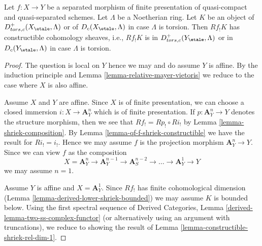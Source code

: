 \begin{theorem}
\label{theorem-constructible-shriek}
Let $f : X \to Y$ be a separated morphism of finite presentation
of quasi-compact and quasi-separated schemes. Let $\Lambda$ be a
Noetherian ring. Let $K$ be an object of $D^+_{tors, c}(X_\etale, \Lambda)$
or of $D_c(X_\etale, \Lambda)$ in case $\Lambda$ is torsion.
Then $Rf_!K$ has constructible cohomology sheaves, i.e.,
$Rf_!K$ is in $D^+_{tors, c}(Y_\etale, \Lambda)$
or in $D_c(Y_\etale, \Lambda)$ in case $\Lambda$ is torsion.
\end{theorem}

\begin{proof}
The question is local on $Y$ hence we may and do assume $Y$ is affine.
By the induction principle and Lemma \ref{lemma-relative-mayer-vietoris}
we reduce to the case where $X$ is also affine.

\medskip\noindent
Assume $X$ and $Y$ are affine. Since $X$ is of finite presentation,
we can choose a closed immersion $i : X \to \mathbf{A}^n_Y$ which is
of finite presentation. If $p : \mathbf{A}^n_Y \to Y$ denotes
the structure morphism, then we see that $Rf_! = Rp_! \circ Ri_!$
by Lemma \ref{lemma-shriek-composition}. By
Lemma \ref{lemma-qf-f-shriek-constructible}
we have the result for $Ri_! = i_!$. Hence we may assume $f$
is the projection morphism $\mathbf{A}^n_Y \to Y$.
Since we can view $f$ as the composition
$$
X = \mathbf{A}^n_Y \to \mathbf{A}^{n - 1}_Y \to
\mathbf{A}^{n - 2}_S \to \ldots \to
\mathbf{A}^1_Y \to Y
$$
we may assume $n = 1$.

\medskip\noindent
Assume $Y$ is affine and $X = \mathbf{A}^1_Y$. Since $Rf_!$ has
finite cohomological dimension
(Lemma \ref{lemma-derived-lower-shriek-bounded})
we may assume $K$ is bounded below. Using the first spectral sequence of
Derived Categories, Lemma \ref{derived-lemma-two-ss-complex-functor}
(or alternatively using an argument with truncations),
we reduce to showing the result of
Lemma \ref{lemma-constructible-shriek-rel-dim-1}.
\end{proof}



















